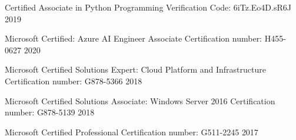 



\begin{cvcertifications}
	
	\cvcertification
	{Certified Associate in Python Programming} %
	{Verification Code: 6iTz.Eo4D.sR6J} %
	{2019} %
	

\end{cvcertifications}




\begin{cvcertifications}
	\cvcertification
	{Microsoft Certified: Azure AI Engineer Associate} %
	{Certification number: H455-0627} %
	{2020} %
	

	\cvcertification
		{Microsoft Certified Solutions Expert: Cloud Platform and Infrastructure} %
		{Certification number: G878-5366} %
		{2018} %
		
	\cvcertification
		{Microsoft Certified Solutions Associate: Windows Server 2016} %
		{Certification number: G878-5139} %
		{2018} %

	\cvcertification
		{Microsoft Certified Professional} %
		{Certification number: G511-2245} %
		{2017} %
\end{cvcertifications}


